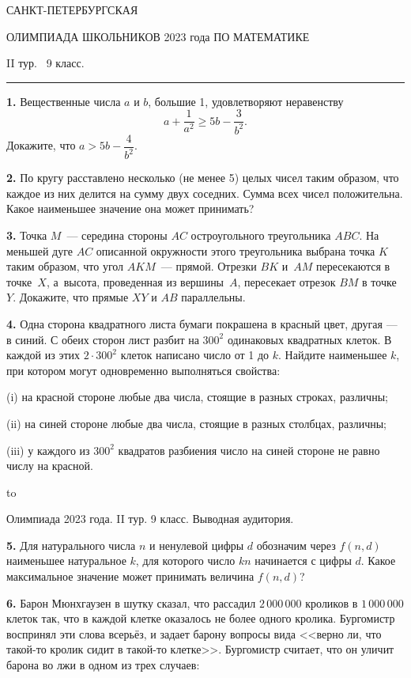\documentclass[12pt]{article}
\def\q#1.{{\bf #1. }}
\def\dotline{\smallskip\hbox to \hsize{\dotfill}\medskip}
\begin{document}
\centerline{\sc САНКТ-ПЕТЕРБУРГСКАЯ}
\centerline{\sc ОЛИМПИАДА ШКОЛЬНИКОВ 2023 года ПО МАТЕМАТИКЕ}
\centerline{\sc II тур. \ 9 класс.}
\medskip
\hrule
\bigskip

\q1. Вещественные числа $a$ и $b$, большие 1, удовлетворяют неравенству 
$$
a+\dfrac{1}{a^2} \geq 5b-\dfrac{3}{b^2}.
$$
Докажите, что $a>5b-\dfrac{4}{b^2}$.

\q2. По кругу расставлено несколько (не менее 5) целых чисел таким образом, что каждое из них делится на сумму двух соседних. Сумма всех чисел положительна. Какое наименьшее значение она может принимать? %

\q3. Точка $M$~--- середина стороны $AC$ остроугольного треугольника $ABC$. На меньшей дуге $AC$ описанной окружности этого треугольника выбрана точка $K$ таким образом, что угол $AKM$~--- прямой. Отрезки $BK$ и~$AM$ пересекаются в точке~$X$, а~высота, проведенная из вершины~$A$, пересекает отрезок $BM$ в точке $Y$. Докажите, что прямые $XY$ и $AB$ параллельны.

\q4. Одна сторона квадратного листа бумаги покрашена в красный цвет, другая --- в синий. С обеих сторон лист разбит на $300^2$ одинаковых квадратных клеток. В каждой из этих $2 \cdot 300^2$ клеток написано число от 1 до $k$. Найдите наименьшее $k$, при котором могут одновременно выполняться свойства:

\smallskip

\noindent
(i) на красной стороне любые два числа, стоящие в разных строках, различны;

\noindent
(ii) на синей стороне любые два числа, стоящие в разных столбцах, различны;

\noindent
(iii) у каждого из $300^2$ квадратов разбиения число на синей стороне не равно числу на красной.

\dotline

\centerline{Олимпиада 2023 года. II тур. 9 класс. Выводная аудитория.}
\smallskip

\q5. Для натурального числа $n$ и ненулевой цифры $d$
обозначим через $f(n,d)$ наименьшее натуральное $k$,
для которого число $kn$ начинается с цифры $d$.
Какое максимальное значение может принимать величина
$f(n,d)$?

\q6. Барон Мюнхгаузен в шутку сказал, что рассадил $2\,000\,000$ кроликов в $1\,000\,000$ клеток так, что в каждой клетке оказалось не более одного кролика. Бургомистр воспринял эти слова всерьёз, и задает барону вопросы вида
<<верно ли, что такой-то кролик сидит в такой-то клетке>>. Бургомистр считает, что он уличит барона во лжи в одном из
трех случаев: 
\end{document}
